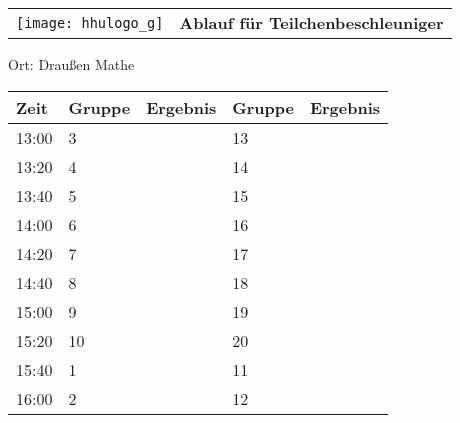 \documentclass[a4paper,10pt]{article}
\def\spielc{Teilchenbeschleuniger}
\def\raumc{Draußen Mathe}
\begin{document}
  \begin{tabularx}{\textwidth}{lc}
    \texttt{[image: hhulogo\_g]}
  & {\Huge \textbf{Ablauf für \spielc}}
  \end{tabularx}
  \LARGE
  \begin{center}
    \vspace{1cm} 
    Ort: \raumc
  \end{center}
    \vspace{2cm} 
    \begin{tabularx}{\textwidth}{X||X|X||X|X}
	\textbf{Zeit} &\textbf{Gruppe} & \textbf{Ergebnis} &\textbf{Gruppe} & \textbf{Ergebnis}  	\\ \hline \hline
	13:00 &	3	&	&13	&	\\ \hline
	13:20 &	4	&	&14	&	\\ \hline
	13:40 &	5	&	&15	&	\\ \hline

	14:00 &	6	&	&16	&	\\ \hline
	14:20 &	7	&	&17	&	\\ \hline
	14:40 &	8	&	&18	&	\\ \hline

	15:00 &	9	&	&19	&	\\ \hline
	15:20 &	10	&	&20	&	\\ \hline
	15:40 &	1	&	&11	&	\\ \hline

	16:00 &	2	&	&12	&	\\ \hline
      
    \end{tabularx}
   
   \newpage
\end{document}
